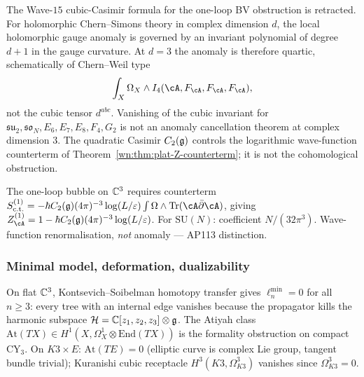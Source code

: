 \begin{theorem}\ClaimStatusCorrected
\label{wn:thm:plat-anomaly}
The Wave-$15$ cubic-Casimir formula for the one-loop BV obstruction is
retracted.  For holomorphic Chern--Simons theory in complex dimension
$d$, the local holomorphic gauge anomaly is governed by an invariant
polynomial of degree $d+1$ in the gauge curvature.  At $d=3$ the anomaly
is therefore quartic, schematically of Chern--Weil type
\[
\int_X \Omega_X\wedge I_4(\cA,F_\cA,F_\cA,F_\cA),
\]
not the cubic tensor $d^{abc}$.  Vanishing of the cubic invariant for
$\mathfrak{su}_2,\mathfrak{so}_N,E_6,E_7,E_8,F_4,G_2$ is not an anomaly
cancellation theorem at complex dimension $3$.  The quadratic Casimir
$C_2(\mathfrak{g})$ controls the logarithmic wave-function counterterm of
Theorem~\ref{wn:thm:plat-Z-counterterm}; it is not the cohomological
obstruction.
\end{theorem}

\begin{theorem}\ClaimStatusTheorem
\label{wn:thm:plat-Z-counterterm}
The one-loop bubble on $\mathbb{C}^3$ requires counterterm
$S^{(1)}_{\mathrm{c.t.}} = -\hbar C_2(\fg)(4\pi)^{-3}\log(L/\varepsilon)
\int \Omega \wedge \mathrm{Tr}(\cA \bar\partial \cA)$,
giving $Z^{(1)}_\cA = 1 - \hbar C_2(\fg)(4\pi)^{-3}\log(L/\varepsilon)$.
For $\mathrm{SU}(N)$: coefficient $N/(32\pi^3)$. Wave-function
renormalisation, \emph{not} anomaly --- AP113 distinction.
\end{theorem}

\subsubsection{Minimal model, deformation, dualizability}

\begin{theorem}\ClaimStatusTheorem
\label{wn:thm:plat-Linf-minimal}
On flat $\mathbb{C}^3$, Kontsevich--Soibelman homotopy transfer gives
$\ell_n^{\min} = 0$ for all $n \geq 3$: every tree with an internal edge
vanishes because the propagator kills the harmonic subspace
$\mathcal{H} = \mathbb{C}[z_1, z_2, z_3] \otimes \mathfrak{g}$. The Atiyah class
$\mathrm{At}(TX) \in H^1(X, \Omega^1_X \otimes \mathrm{End}(TX))$
is the formality obstruction on compact CY$_3$. On $K3 \times E$:
$\mathrm{At}(TE) = 0$ (elliptic curve is complex Lie group, tangent bundle
trivial); Kuranishi cubic receptacle $H^3(K3, \Omega^3_{K3})$ vanishes
since $\Omega^3_{K3} = 0$.
\end{theorem}


